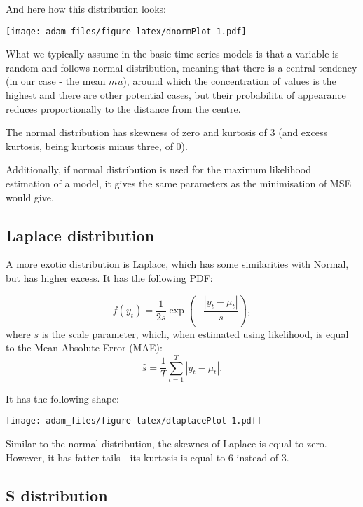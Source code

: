 \documentclass[]{book}
\begin{document}
And here how this distribution looks:

\texttt{[image: adam\_files/figure-latex/dnormPlot-1.pdf]}

What we typically assume in the basic time series models is that a variable is random and follows normal distribution, meaning that there is a central tendency (in our case - the mean \(mu\)), around which the concentration of values is the highest and there are other potential cases, but their probabilitu of appearance reduces proportionally to the distance from the centre.

The normal distribution has skewness of zero and kurtosis of 3 (and excess kurtosis, being kurtosis minus three, of 0).

Additionally, if normal distribution is used for the maximum likelihood estimation of a model, it gives the same parameters as the minimisation of MSE would give.

\hypertarget{laplace-distribution}{%
\subsection{Laplace distribution}\label{laplace-distribution}}

A more exotic distribution is Laplace, which has some similarities with Normal, but has higher excess. It has the following PDF:

\begin{equation} \label{eq:Laplace}
    f(y_t) = \frac{1}{2 s} \exp \left( -\frac{\left| y_t - \mu_t \right|}{s} \right) ,
\end{equation}
where \(s\) is the scale parameter, which, when estimated using likelihood, is equal to the Mean Absolute Error (MAE):
\begin{equation} \label{eq:sLaplace}
    \hat{s} = \frac{1}{T} \sum_{t=1}^T \left| y_t - \mu_t \right| .
\end{equation}

It has the following shape:

\texttt{[image: adam\_files/figure-latex/dlaplacePlot-1.pdf]}

Similar to the normal distribution, the skewnes of Laplace is equal to zero. However, it has fatter tails - its kurtosis is equal to 6 instead of 3.

\hypertarget{s-distribution}{%
\subsection{S distribution}\label{s-distribution}}
\end{document}
